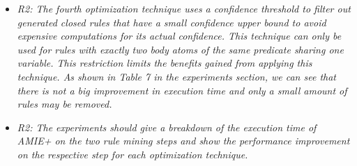 \begin{figure*}[t!]
\hspace{.1\textwidth}
\begin{minipage}{.8\textwidth}
\large 
\begin{itemize}
      
      \item \textit{R2: The fourth optimization technique uses a confidence threshold to filter out generated closed rules that have a 
      small confidence upper bound to avoid expensive computations for its actual confidence. 
      This technique can only be used for rules with exactly two body atoms of the same predicate sharing one variable. 
      This restriction limits the benefits gained from applying this technique. 
      As shown in Table 7 in the experiments section, we can see that there is not a big improvement in execution time and only a small amount of rules may be removed.\\  }
      
      \item \textit{R2: The experiments should give a breakdown of the execution time of AMIE+ on the two rule mining steps and show the performance improvement on the respective step for each optimization technique.\\  }
      

\end{itemize}
\end{minipage}
\end{figure*}
